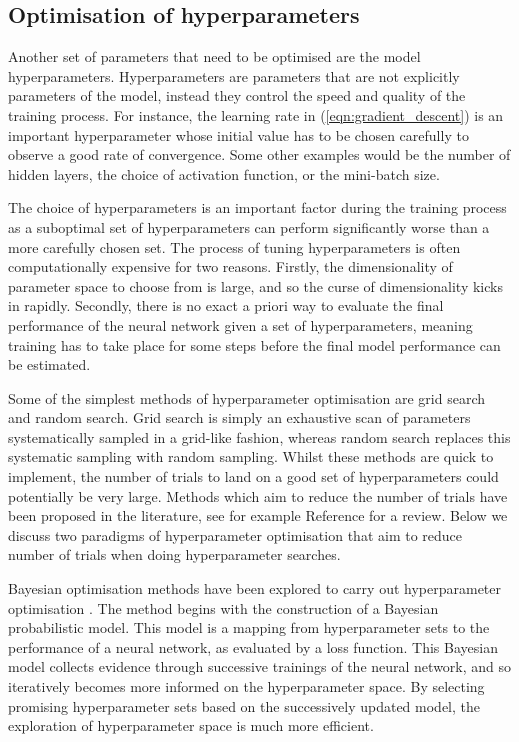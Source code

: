 \documentclass[main.tex]{subfiles}
\begin{document}
    \subsection{Optimisation of hyperparameters}
    Another set of parameters that need to be optimised
    are the model hyperparameters.
    Hyperparameters are parameters that are
    not explicitly parameters of the model, instead they control
    the speed and quality of the training process.
    For instance, the learning rate in ({\ref{eqn:gradient_descent}}) is
    an important hyperparameter whose initial value has
    to be chosen carefully to observe a good rate of convergence.
    Some other examples would be
    the number of hidden layers, the choice of activation
    function, or the mini-batch size.

    The choice of hyperparameters is an important
    factor during the training process as a suboptimal set
    of hyperparameters can perform significantly worse
    than a more carefully chosen set. The process of tuning
    hyperparameters is often computationally expensive for two
    reasons. Firstly, the dimensionality of parameter space to choose from is large,
    and so the curse of dimensionality kicks in rapidly.
    Secondly, there is no exact a priori way to evaluate the
    final performance of the neural network given a set of
    hyperparameters, meaning training has to take place for
    some steps before the final model performance can be estimated.
    
    Some of the simplest methods of hyperparameter optimisation
    are grid search and random search. Grid search is simply
    an exhaustive scan of parameters systematically sampled
    in a grid-like fashion, whereas random search replaces
    this systematic sampling with random sampling. Whilst
    these methods are quick to implement, the number of trials
    to land on a good set of hyperparameters could potentially
    be very large. Methods which aim to reduce the number
    of trials have been proposed in the literature, see for example
    Reference \cite{Yu2020HyperParameterOA} for a review.
    Below we discuss two paradigms of hyperparameter optimisation
    that aim to reduce number of trials when doing hyperparameter searches.

    Bayesian optimisation methods have been explored
    to carry out hyperparameter optimisation \cite{bergstra2013making,bergstra2015hyperopt}.
    The method begins with the construction of a 
    Bayesian probabilistic model. This model is a mapping
    from hyperparameter sets to the performance
    of a neural network, as evaluated by a loss function. 
    This Bayesian model collects evidence
    through successive trainings of the neural network,
    and so iteratively becomes more informed on the hyperparameter
    space. By selecting promising hyperparameter
    sets based on the successively updated model, the exploration of
    hyperparameter space is much more efficient.
\end{document}
